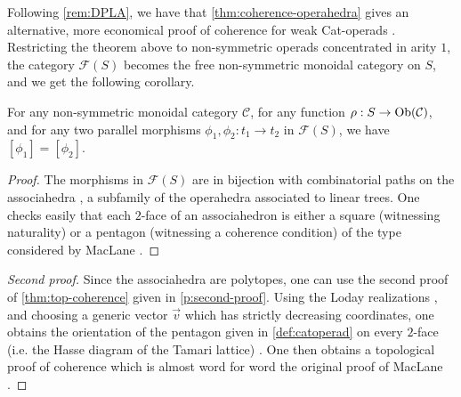 Following \cref{rem:DPLA}, we have that \cref{thm:coherence-operahedra} gives an alternative, more economical proof of coherence for weak Cat-operads \cite[Proposition 14.2]{DP15}. 
Restricting the theorem above to non-symmetric operads concentrated in arity $1$, the category $\mathcal{F}(S)$ becomes the free non-symmetric monoidal category on $S$, and we get the following corollary. 

\begin{corollary}
\label{cor:MacLane}
    For any non-symmetric monoidal category $\mathcal{C}$, for any function $\rho : S \to \mathrm{Ob}(\mathcal{C})$, and for any two parallel morphisms $\phi_1,\phi_2: t_1 \to t_2$ in $\mathcal{F}(S)$, we have $[\phi_1]=[\phi_2]$.
\end{corollary}

\begin{proof}
    The morphisms in $\mathcal{F}(S)$ are in bijection with combinatorial paths on the associahedra \cite{Stasheff63,CSZ15}, a subfamily of the operahedra associated to linear trees. 
    One checks easily that each $2$-face of an associahedron is either a square (witnessing naturality) or a pentagon (witnessing a coherence condition) of the type considered by MacLane \cite[Equation (3.5)]{MacLane63}.
\end{proof}

\begin{proof}[Second proof]
    Since the associahedra are polytopes, one can use the second proof of \cref{thm:top-coherence} given in \cref{p:second-proof}. 
    Using the Loday realizations \cite[Section 1.2]{masudaDiagonalAssociahedra2021a}, and choosing a generic vector $\vec v$ which has strictly decreasing coordinates, one obtains the orientation of the pentagon given in \cref{def:catoperad} on every $2$-face (i.e. the Hasse diagram of the Tamari lattice) \cite[Proposition 2]{masudaDiagonalAssociahedra2021a}. 
    One then obtains a topological proof of coherence which is almost word for word the original proof of MacLane \cite[Theorem 3.1]{MacLane63}. 
\end{proof}



